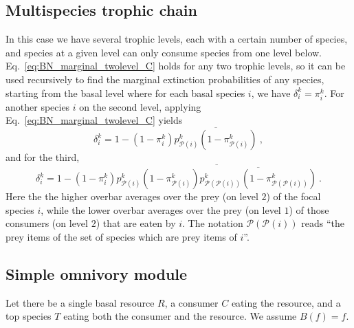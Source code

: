 \documentclass[11pt]{article}
\newcommand{\ol}[1]{\overline{#1}}
\begin{document}
\subsection{Multispecies trophic chain} \label{sec:mtc}

In this case we have several trophic levels, each with a certain number of species, and species at a given level can only consume species from one level below. Eq.~\ref{eq:BN_marginal_twolevel_C} holds for any two trophic levels, so it can be used recursively to find the marginal extinction probabilities of any species, starting from the basal level where for each basal species $i$, we have $\delta_i^k = \pi_i^k$. For another species $i$ on the second level, applying Eq.~\ref{eq:BN_marginal_twolevel_C} yields
\begin{equation}
  \label{eq:BN_mtc}
  \delta_i^k = 1 - (1 - \pi_i^k) \ol{p_{\mathcal{P}(i)}^k
    (1 - \pi_{\mathcal{P}(i)}^k)} \ ,
\end{equation}
and for the third,
\begin{equation}
  \label{eq:BN_mtc_2}
  \delta_i^k = 1 - (1 - \pi_i^k) \ol{p_{\mathcal{P}(i)}^k
    (1-\pi_{\mathcal{P}(i)}^k)\ol{p_{\mathcal{P}(\mathcal{P}(i))}^k
      (1-\pi_{\mathcal{P}(\mathcal{P}(i))}^k)}} \ .
\end{equation}
Here the the higher overbar averages over the prey (on level $2$) of the focal species $i$, while the lower overbar averages over the prey (on level $1$) of those consumers (on level $2$) that are eaten by $i$. The notation $\mathcal{P}(\mathcal{P}(i))$ reads ``the prey items of the set of species which are prey items of $i$''.

\subsection{Simple omnivory module}

Let there be a single basal resource $R$, a consumer $C$ eating the resource, and a top species $T$ eating both the consumer and the resource. We assume $B(f)=f$.
\end{document}
